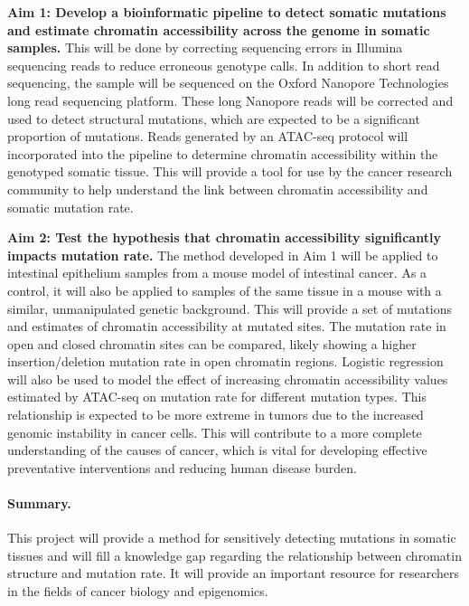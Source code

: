 \textbf{Aim 1: Develop a bioinformatic pipeline to detect somatic mutations and estimate chromatin accessibility across the genome in somatic samples.}
This will be done by correcting sequencing errors in Illumina sequencing reads to reduce erroneous genotype calls. In addition to short read sequencing, the sample will be sequenced on the Oxford Nanopore Technologies long read sequencing platform. These long Nanopore reads will be corrected and used to detect structural mutations, which are expected to be a significant proportion of mutations. 
Reads generated by an ATAC-seq protocol will incorporated into the pipeline to determine chromatin accessibility within the genotyped somatic tissue. This will provide a tool for use by the cancer research community to help understand the link between chromatin accessibility and somatic mutation rate.

\textbf{Aim 2: Test the hypothesis that chromatin accessibility significantly impacts mutation rate.}
The method developed in Aim 1 will be applied to intestinal epithelium samples from a mouse model of intestinal cancer.
As a control, it will also be applied to samples of the same tissue in a mouse with a similar, unmanipulated genetic background.
This will provide a set of mutations and estimates of chromatin accessibility at mutated sites. The mutation rate in open and closed chromatin sites can be compared, likely showing a higher insertion/deletion mutation rate in open chromatin regions.
Logistic regression will also be used to model the effect of increasing chromatin accessibility values estimated by ATAC-seq on mutation rate for different mutation types.
This relationship is expected to be more extreme in tumors due to the increased genomic instability in cancer cells.
This will contribute to a more complete understanding of the causes of cancer, which is vital for developing effective preventative interventions and reducing human disease burden.

\paragraph{Summary.}
This project will provide a method for sensitively detecting  mutations in somatic tissues and will fill a knowledge gap regarding the relationship between chromatin structure and mutation rate. It will provide an important resource for researchers in the fields of cancer biology and epigenomics.
